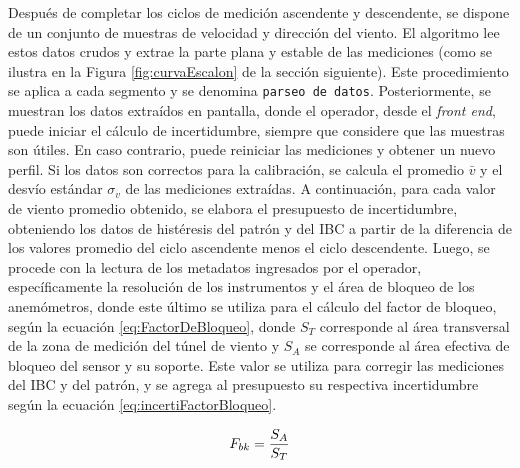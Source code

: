 Después de completar los ciclos de medición ascendente y descendente, se dispone de un conjunto de muestras de velocidad y dirección del viento. El algoritmo lee estos datos crudos y extrae la parte plana y estable de las mediciones (como se ilustra en la Figura \ref{fig:curvaEscalon} de la sección siguiente). Este procedimiento se aplica a cada segmento y se denomina \texttt{parseo de datos}. Posteriormente, se muestran los datos extraídos en pantalla, donde el operador, desde el \textit{front end}, puede iniciar el cálculo de incertidumbre, siempre que considere que las muestras son útiles. En caso contrario, puede reiniciar las mediciones y obtener un nuevo perfil. Si los datos son correctos para la calibración, se calcula el promedio $\bar{v}$ y el desvío estándar $\sigma_{v}$ de las mediciones extraídas. A continuación, para cada valor de viento promedio obtenido, se elabora el presupuesto de incertidumbre, obteniendo los datos de histéresis del patrón y del IBC a partir de la diferencia de los valores promedio del ciclo ascendente menos el ciclo descendente. Luego, se procede con la lectura de los metadatos ingresados por el operador, específicamente la resolución de los instrumentos y el área de bloqueo de los anemómetros, donde este último se utiliza para el cálculo del factor de bloqueo, según la ecuación \ref{eq:FactorDeBloqueo}, donde $S_{T}$ corresponde al área transversal de la zona de medición del túnel de viento y $S_{A}$ se corresponde al área efectiva de bloqueo del sensor y su soporte. Este valor se utiliza para corregir las mediciones del IBC y del patrón, y se agrega al presupuesto su respectiva incertidumbre según la ecuación \ref{eq:incertiFactorBloqueo}.


\begin{equation}
    \centering
    F_{bk}= \frac{S_{A} }{S_{T}}
    \label{eq:FactorDeBloqueo}
\end{equation}

